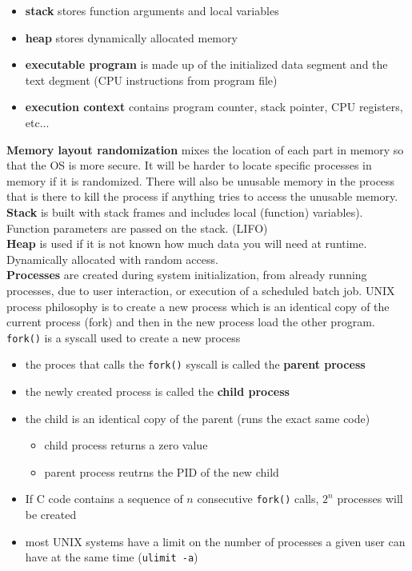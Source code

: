 \documentclass{article}
\begin{document}
    \begin{itemize}
    \item \textbf{stack} stores function arguments and local variables
    \item \textbf{heap} stores dynamically allocated memory
    \item \textbf{executable program} is made up of the initialized data segment and the text degment (CPU instructions from program file)
    \item \textbf{execution context} contains program counter, stack pointer, CPU registers, etc...
    \end{itemize}

    \noindent \textbf{Memory layout randomization} mixes the location of each part in memory so that the OS is more secure. It will be harder to locate specific processes in memory if it is randomized. There will also be unusable memory in the process that is there to kill the process if anything tries to access the unusable memory. \\

    \noindent \textbf{Stack} is built with stack frames and includes local (function) variables). Function parameters are passed on the stack. (LIFO) \\

    \noindent \textbf{Heap} is used if it is not known how much data you will need at runtime. Dynamically allocated with random access. \\ 

    \noindent \textbf{Processes} are created during system initialization, from already running processes, due to user interaction, or execution of a scheduled batch job. UNIX process philosophy is to create a new process which is an identical copy of the current process (fork) and then in the new process load the other program. \\

    \noindent \texttt{fork()} is a syscall used to create a new process

    \begin{itemize}
    \item the proces that calls the \texttt{fork()} syscall is called the \textbf{parent process}
    \item the newly created process is called the \textbf{child process}
    \item the child is an identical copy of the parent (runs the exact same code)
    \begin{itemize}
    \item child process returns a zero value
    \item parent process reutrns the PID of the new child
    \end{itemize}
    \item If C code contains a sequence of $n$ consecutive \texttt{fork()} calls, $2^n$ processes will be created
    \item most UNIX systems have a limit on the number of processes a given user can have at the same time (\texttt{ulimit -a})
    \end{itemize}
    
\end{document}
